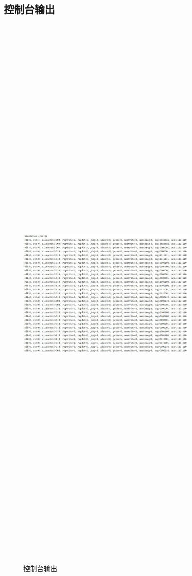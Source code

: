 \subsection{控制台输出}
\begin{figure}[htbp]
    \centering
    \includegraphics[width=0.8\textwidth,height=15in,keepaspectratio]{Simulation2.jpg}
    \caption{控制台输出}
    \label{image5}
\end{figure}